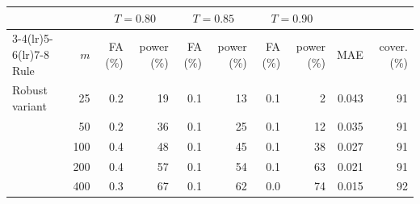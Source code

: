 \begin{tabular*}{\tblwidth}{@{\extracolsep{\fill}}lrrrrrrrrr@{}}
\toprule
 & & \multicolumn{2}{c}{$T=0.80$} & \multicolumn{2}{c}{$T=0.85$} & \multicolumn{2}{c}{$T=0.90$} & & \\
\cmidrule(lr){3-4}\cmidrule(lr){5-6}\cmidrule(lr){7-8}
Rule & $m$ & FA (\%) & power (\%) & FA (\%) & power (\%) & FA (\%) & power (\%) & MAE & cover. (\%) \\
\midrule
Robust variant & 25 & 0.2 & 19 & 0.1 & 13 & 0.1 & 2 & 0.043 & 91 \\
 & 50 & 0.2 & 36 & 0.1 & 25 & 0.1 & 12 & 0.035 & 91 \\
 & 100 & 0.4 & 48 & 0.1 & 45 & 0.1 & 38 & 0.027 & 91 \\
 & 200 & 0.4 & 57 & 0.1 & 54 & 0.1 & 63 & 0.021 & 91 \\
 & 400 & 0.3 & 67 & 0.1 & 62 & 0.0 & 74 & 0.015 & 92 \\
\bottomrule
\end{tabular*}
